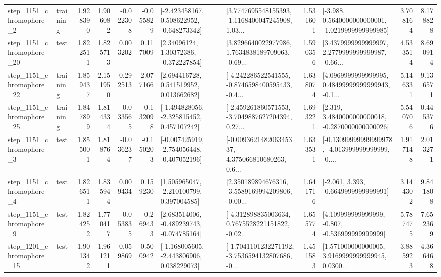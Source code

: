 \begin{tabular}{llrrrrllrlrr}
  step\_1151\_chromophore\_2 &  training &      1.928390 &    1.906082 &     -0.022308 & -0.055829 &   [-2.423458167, 0.508622952, -0.648273342] &  [3.7747695548155393, -1.1168400047245908, 1.03... &       1.531601 &  [-3.988, 0.5640000000000001, -1.0219999999999985] &            3.708164 &          8.178828 \\
 step\_1151\_chromophore\_20 &      test &      1.822511 &    1.825713 &      0.003202 &  0.117009 &      [2.34096124, 1.30372386, -0.372227854] &  [3.8296640022977986, 1.7634838189709063, -0.69... &       1.590356 &  [3.4379999999999997, 2.2779999999999987, -0.66... &            4.533514 &          8.690914 \\
 step\_1151\_chromophore\_22 &  training &      1.859437 &    2.151950 &      0.292513 &  2.077166 &     [2.694416728, 0.541519952, 0.013662682] &  [-4.242286522541555, -0.8746598400595433, -0.4... &       1.638074 &  [4.0969999999999995, 0.48499999999999943, -0.1... &            5.146331 &          9.136571 \\
 step\_1151\_chromophore\_25 &  training &      1.847899 &    1.814334 &     -0.033565 & -0.132098 &   [-1.494828056, -2.325815452, 0.457107242] &  [-2.459261860571553, -3.7049887627204394, 0.27... &       1.693221 &   [2.319, 3.4840000000000018, -0.2870000000000026] &            5.540706 &          0.445376 \\
  step\_1151\_chromophore\_3 &      test &      1.855001 &    1.818764 &     -0.036237 & -0.150203 &  [-0.007425919, -2.754056448, -0.407052196] &  [-0.009362148206345337, 4.375066810680263, 0.6... &       1.633531 &  [-0.13099999999999978, -4.013999999999999, -0.... &            1.917148 &          2.013271 \\
  step\_1151\_chromophore\_4 &      test &      1.826511 &    1.835944 &      0.009434 &  0.159230 &    [1.505965047, -2.210100799, 0.397004585] &  [2.350189894676316, -3.5589169994209806, -0.00... &       1.641716 &               [-2.061, 3.393, -0.6649999999999991] &            3.144302 &          9.841808 \\
  step\_1151\_chromophore\_9 &      test &      1.824252 &    1.770417 &     -0.053835 & -0.269433 &   [2.683514006, -0.489239743, -0.074785164] &  [-4.312898835003634, 0.7675528221151822, -0.02... &       1.655774 &    [4.109999999999999, -0.807, -0.536999999999999] &            5.787475 &          7.652369 \\
 step\_1201\_chromophore\_15 &      test &      1.901342 &    1.961211 &      0.059869 &  0.500942 &   [-1.168005605, -2.443806906, 0.038229073] &  [-1.7041101232271192, -3.7536594132807686, -0.... &       1.451583 &  [1.571000000000005, 3.9169999999999945, 0.0300... &            3.885923 &          4.366468 \\

\end{tabular}
